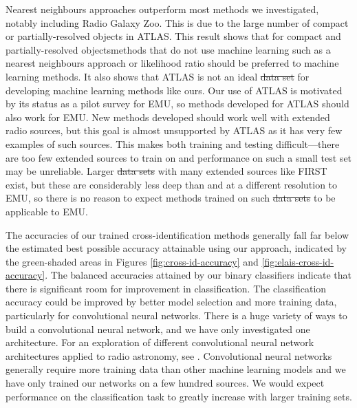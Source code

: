 \documentclass[11pt, a4paper]{book}
\providecommand{\DIFaddtex}[1]{{\protect\color{blue}\uwave{#1}}} %
\providecommand{\DIFdeltex}[1]{{\protect\color{red}\sout{#1}}}                      %
\providecommand{\DIFaddbegin}{} %
\providecommand{\DIFaddend}{} %
\providecommand{\DIFdelbegin}{} %
\providecommand{\DIFdelend}{} %
\providecommand{\DIFadd}[1]{\texorpdfstring{\DIFaddtex{#1}}{#1}} %
\providecommand{\DIFdel}[1]{\texorpdfstring{\DIFdeltex{#1}}{}} %
\newcommand{\DIFscaledelfig}{0.5}
\newlength{\DIFdelgraphicswidth} %
\newlength{\DIFdelgraphicsheight} %
\newcommand{\DIFaddincludegraphics}[2][]{{\color{blue}\fbox{\DIFOincludegraphics[#1]{#2}}}} %
\newcommand{\DIFdelincludegraphics}[2][]{%
\sbox{\DIFdelgraphicsbox}{\DIFOincludegraphics[#1]{#2}}%
\settoboxwidth{\DIFdelgraphicswidth}{\DIFdelgraphicsbox} %
\settoboxtotalheight{\DIFdelgraphicsheight}{\DIFdelgraphicsbox} %
\scalebox{\DIFscaledelfig}{%
\parbox[b]{\DIFdelgraphicswidth}{\usebox{\DIFdelgraphicsbox}\\[-\baselineskip] \rule{\DIFdelgraphicswidth}{0em}}\llap{\resizebox{\DIFdelgraphicswidth}{\DIFdelgraphicsheight}{%
\setlength{\unitlength}{\DIFdelgraphicswidth}%
\begin{picture}(1,1)%
\thicklines\linethickness{2pt} %
{\color[rgb]{1,0,0}\put(0,0){\framebox(1,1){}}}%
{\color[rgb]{1,0,0}\put(0,0){\line( 1,1){1}}}%
{\color[rgb]{1,0,0}\put(0,1){\line(1,-1){1}}}%
\end{picture}%
}\hspace*{3pt}}} %
} %
\DeclareRobustCommand{\DIFaddbegin}{\DIFOaddbegin \let\includegraphics\DIFaddincludegraphics} %
\DeclareRobustCommand{\DIFaddend}{\DIFOaddend \let\includegraphics\DIFOincludegraphics} %
\DeclareRobustCommand{\DIFdelbegin}{\DIFOdelbegin \let\includegraphics\DIFdelincludegraphics} %
\DeclareRobustCommand{\DIFdelend}{\DIFOaddend \let\includegraphics\DIFOincludegraphics} %
\begin{document}
  Nearest neighbours approaches outperform most methods we investigated,
  notably including Radio Galaxy Zoo. This is due to the large number of
  compact or partially-resolved objects in ATLAS. This result shows that for
  compact and partially-resolved objects\DIFaddbegin \DIFadd{, }\DIFaddend methods that do not use machine
  learning such as a nearest neighbours approach or likelihood ratio
  \citep{weston18lrpy} should be preferred to machine learning methods. It
  also shows that ATLAS is not an ideal \DIFdelbegin \DIFdel{data set }\DIFdelend \DIFaddbegin \DIFadd{dataset }\DIFaddend for developing machine
  learning methods like ours. Our use of ATLAS is motivated by its status as a
  pilot survey for EMU, so methods developed for ATLAS should also work for
  EMU. New methods developed should work well with extended radio sources, but
  this goal is almost unsupported by ATLAS as it has very few examples of such
  sources. This makes both training and testing difficult---there are too
  few extended sources to train on and performance on such a small test set
  may be unreliable. Larger \DIFdelbegin \DIFdel{data sets }\DIFdelend \DIFaddbegin \DIFadd{datasets }\DIFaddend with many extended sources like FIRST
  exist, but these are considerably less deep than and at a different
  resolution to EMU, so there is no reason to expect methods trained on such
  \DIFdelbegin \DIFdel{data sets }\DIFdelend \DIFaddbegin \DIFadd{datasets }\DIFaddend to be applicable to EMU.

  The accuracies of our trained cross-identification methods generally fall
  far below the estimated best possible accuracy attainable using our approach,
  indicated by the green-shaded areas in Figures \ref{fig:cross-id-accuracy} and
  \ref{fig:elais-cross-id-accuracy}. The balanced accuracies attained by our
  binary classifiers indicate that there is significant room for improvement
  in classification. The classification accuracy could be improved by better
  model selection and more training data, particularly for convolutional
  neural networks. There is a huge variety of ways to build a convolutional
  neural network, and we have only investigated one architecture. For an
  exploration of different convolutional neural network architectures applied
  to radio astronomy, see \citet{lukic18compact}. Convolutional neural
  networks generally require more training data than other machine learning
  models and we have only trained our networks on a few hundred sources. We
  would expect performance on the classification task to greatly increase
  with larger training sets.
\end{document}

